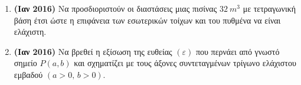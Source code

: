 






\begin{center}
\end{center}

\vspace{\baselineskip}

\begin{enumerate}

	\item {\bfseries (Ιαν 2016)} Να προσδιοριστούν οι διαστάσεις μιας πισίνας $ \SI{32}{m^{3}} $ με
		τετραγωνική βάση έτσι ώστε η επιφάνεια των εσωτερικών τοίχων και του
		πυθμένα να είναι ελάχιστη. 

	\item {\bfseries (Ιαν 2016)} Να βρεθεί η εξίσωση της ευθείας $ (\varepsilon)
		$ που περνάει από γνωστό σημείο $ P(a,b) $ και σχηματίζει με τους άξονες
		συντεταγμένων τρίγωνο ελάχιστου εμβαδού $ (a>0,\, b>0) $.

\end{enumerate}


